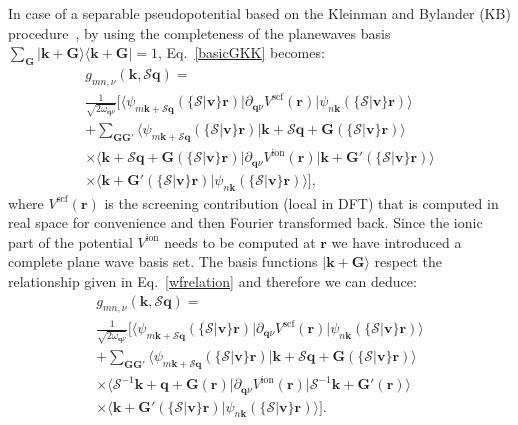 \documentclass[final,3p,times,twocolumn]{elsarticle}
\begin{document}
In case of a separable pseudopotential based on the Kleinman and Bylander (KB) procedure~\cite{Kleinman1982}, by using the completeness of the planewaves basis $\sum_{\mathbf{G}}|\mathbf{k}+\mathbf{G}\rangle \langle \mathbf{k}+\mathbf{G} |= 1$, Eq.~\eqref{basicGKK} becomes:
\begin{multline}
	g_{mn,\nu}(\mathbf{k,\mathcal{S}q}) = \\
	 \frac{1}{\sqrt{2\omega_{\mathbf{q}\nu}} } \Big[ \big\langle  \psi_{m\mathbf{k+\mathcal{S}q}}(\{\mathcal{S}|\mathbf{v}\}\mathbf{r}) \big| \partial_{\mathbf{q}\nu}V^{\text{scf}} (\mathbf{r}) \big| \psi_{n\mathbf{k}} (\{\mathcal{S}|\mathbf{v}\}\mathbf{r}) \big\rangle  \\	 
	+ \sum_{\mathbf{G}\mathbf{G'}}  
\big\langle  \psi_{m\mathbf{k+\mathcal{S}q}} (\{\mathcal{S} |\mathbf{v}\}\mathbf{r}) \big|  \mathbf{k}+ \mathcal{S}\mathbf{q} + \mathbf{G}(\{\mathcal{S} |\mathbf{v}\}\mathbf{r}) 	\big\rangle \\
	 \times \big\langle \mathbf{k}+ \mathcal{S}\mathbf{q} + \mathbf{G} (\{\mathcal{S} |\mathbf{v}\}\mathbf{r})  \big| \partial_{\mathbf{q}\nu}V^{\text{ion}} (\mathbf{r})  \big|    \mathbf{k}+\mathbf{G}' (\{\mathcal{S} |\mathbf{v}\}\mathbf{r})  \big\rangle \\
	    \times \big\langle   \mathbf{k} + \mathbf{G}'(\{\mathcal{S}|\mathbf{v}\}\mathbf{r})   \big|  \psi_{n\mathbf{k}}(\{\mathcal{S}|\mathbf{v}\}\mathbf{r})  \big\rangle  \Big],
\end{multline}
where $V^{\text{scf}} (\mathbf{r})$ is the screening contribution (local in DFT) that is computed in real space for convenience and then Fourier transformed back. Since the ionic part of the potential $V^{\text{ion}}$ needs to be computed at $\mathbf{r}$ we have introduced a complete plane wave basis set. The basis functions $|\mathbf{k}+\mathbf{G}\rangle$ respect the relationship given in Eq.~\eqref{wfrelation} and therefore we can deduce:
\begin{multline}\label{separableGKK}
	g_{mn,\nu}(\mathbf{k,\mathcal{S}q}) =\\
	  \frac{1}{\sqrt{2\omega_{\mathbf{q}\nu}}}
	 \Big[ \big\langle  \psi_{m\mathbf{k+\mathcal{S}q}}(\{\mathcal{S}|\mathbf{v}\}\mathbf{r}) \big| \partial_{\mathbf{q}\nu}V^{\text{scf}} (\mathbf{r}) \big| \psi_{n\mathbf{k}}(\{\mathcal{S}|\mathbf{v}\}\mathbf{r}) \big\rangle  \\	 
	+\sum_{\mathbf{G}\mathbf{G'}} 
	 \big\langle \psi_{m\mathbf{k+\mathcal{S}q}}(\{\mathcal{S} |\mathbf{v}\}\mathbf{r}) \big|   \mathbf{k}+ \mathcal{S}\mathbf{q} + \mathbf{G}(\{\mathcal{S} |\mathbf{v}\}\mathbf{r})  \big\rangle \\
	 \times \big\langle  \mathcal{S}^{-1}\mathbf{k}+\mathbf{q}+\mathbf{G} (\mathbf{r}) \big| \partial_{\mathbf{q}\nu}V^{\text{ion}} (\mathbf{r}) \big| \mathcal{S}^{-1}\mathbf{k}+\mathbf{G}' (\mathbf{r})  \big\rangle \\
	   \times \big\langle \mathbf{k} + \mathbf{G}'(\{\mathcal{S} |\mathbf{v}\}\mathbf{r})   \big| \psi_{n\mathbf{k}}  (\{\mathcal{S}|\mathbf{v}\}\mathbf{r})  \big\rangle \Big].
\end{multline}
\end{document}
